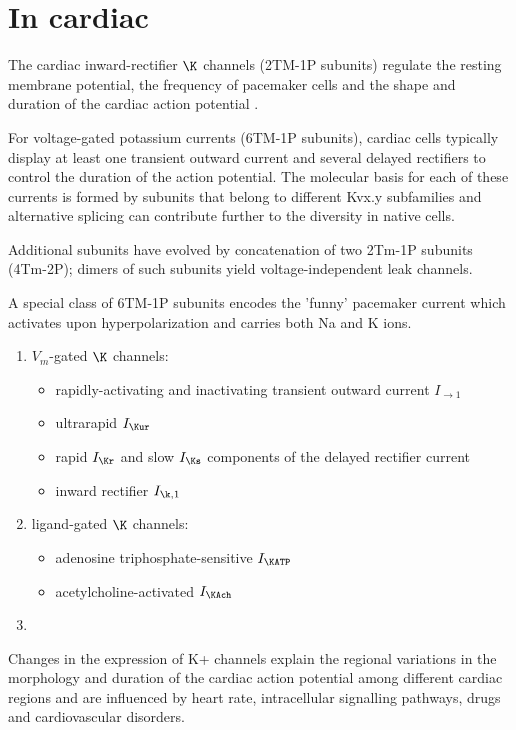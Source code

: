 \section{In cardiac}

The cardiac inward-rectifier $\K$ channels (2TM-1P subunits) regulate the
resting membrane potential, the frequency of pacemaker cells and the shape and
duration of the cardiac action potential \citep{tamargo2004}.

For voltage-gated potassium currents (6TM-1P subunits), cardiac cells typically
display at least one transient outward current and several delayed rectifiers to
control the duration of the action potential. The molecular basis for each of
these currents is formed by subunits that belong to different Kvx.y subfamilies
and alternative splicing can contribute further to the diversity in native
cells.

Additional subunits have evolved by concatenation of two 2Tm-1P subunits
(4Tm-2P); dimers of such subunits yield voltage-independent leak channels.

A special class of 6TM-1P subunits encodes the 'funny' pacemaker current which
activates upon hyperpolarization and carries both Na and K ions.

\begin{enumerate}
  \item $V_m$-gated $\K$ channels: 
  \begin{itemize}
    \item rapidly-activating and inactivating transient outward current
    $I_{\to1}$
    \item ultrarapid $I_\Kur$
    \item rapid $I_\Kr$ and slow $I_\Ks$ components of the delayed rectifier
    current
    \item inward rectifier $I_{\k,1}$
  \end{itemize}
  
  \item ligand-gated $\K$ channels:
  \begin{itemize}
    \item adenosine triphosphate-sensitive $I_\KATP$
    \item acetylcholine-activated $I_\KAch$
  \end{itemize}
  
  \item 
\end{enumerate}

Changes in the expression of K+ channels explain the regional variations in the
morphology and duration of the cardiac action potential among different cardiac
regions and are influenced by heart rate, intracellular signalling pathways,
drugs and cardiovascular disorders.

